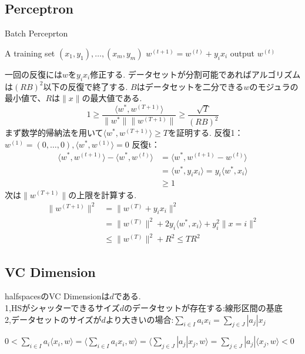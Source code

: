 \documentclass{jarticle}
\theoremstyle{definition}
\begin{document}
\subsection{Perceptron}
\begin{algorithm}
\caption{Batch Perceprton}
\begin{algorithmic}[1]
	\Require A training set $(x_1,y_1), \dots , (x_m,y_m)$
	\State $w^{(t+1)} = w^{(t)} + y_ix_i$
	\Else
	\State output $w^{(t)}$
	\EndIf
	\EndFor
\end{algorithmic}
\end{algorithm}
一回の反復には$w$を$y_ix_i$修正する.
データセットが分割可能であればアルゴリズムは$(RB)^2$以下の反復で終了する.
$B$はデータセットを二分できる$w$のモジュラの最小値で、$R$は$\|x\|$の最大値である.
\begin{equation} \label{eq:pp1}
1 \ge \frac{\langle w^* , w^{(T+1)} \rangle }{\|w^*\|\|w^{(T+1)}\|} \ge \frac{\sqrt{T}}{(RB)^2}
\end{equation}
まず数学的帰納法を用いて$\langle w^*,w^{(T+1)} \rangle \ge T$を証明する.
反復1：$w^{(1)} = (0, \dots , 0),\langle w^* , w^{(1)} \rangle = 0$ 
反復t：
\begin{equation}
\begin{aligned}
\langle w^* , w^{(t+1)} \rangle - \langle w^* , w^{(t)} \rangle & = \langle w^* , w^{(t+1)} - w^{(t)} \rangle \\
& = \langle w^* , y_ix_i \rangle = y_i \langle w^* , x_i \rangle \\
& \ge 1
\end{aligned}
\end{equation}
次は$\| w^{(T+1)} \|$の上限を計算する.
\begin{equation}
\begin{aligned}
\| w^{(T+1)} \|^2 & = \| w^{(T)} + y_ix_i \|^2 \\
& = \| w^{(T)}\|^2 + 2y_i \langle w^* , x_i \rangle + y_i^2\| x=i \|^2\\
& \le \| w^{(T)} \|^2 + R^2 \le TR^2
\end{aligned}
\end{equation}

\subsection{VC Dimension}
halfspacesのVC Dimensionは$d$である. \\
1,HSがシャッターできるサイズ$d$のデータセットが存在する:線形区間の基底 \\
2,データセットのサイズが$d$より大きいの場合:$\sum_{i \in I} a_ix_i = \sum_{j \in J} |a_j|x_j$ \\
\begin{small}
$0 < \sum_{i \in I} a_i \langle x_i,w \rangle = \langle \sum_{i \in I} a_ix_i,w \rangle = \langle \sum_{j \in J} |a_j|x_j,w \rangle = \sum_{j \in J} |a_j| \langle x_j,w \rangle < 0$
\end{small}
\end{document}
